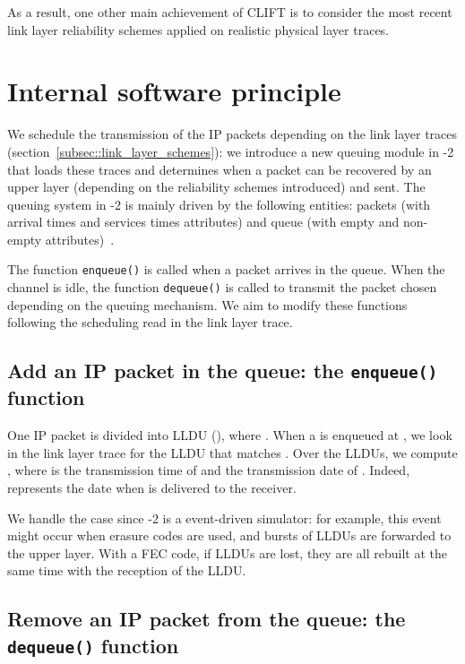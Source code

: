 \documentclass[conference,letterpaper]{IEEEtran}
\begin{document}
As a result, one other main achievement of CLIFT is to consider the most recent link layer reliability schemes applied on realistic physical layer traces.









\section{Internal software principle}
\label{sec::ns2}

We schedule the transmission of the IP packets depending on the link layer traces (section~\ref{subsec::link_layer_schemes}): we introduce a new queuing module in -2 that loads these traces and determines when a packet can be recovered by an upper layer (depending on the reliability schemes introduced) and sent. The queuing system in -2 is mainly driven by the following entities: packets (with arrival times and services times attributes) and queue (with empty and non-empty attributes)~\cite{ns2_manual}.

The function \texttt{enqueue()} is called when a packet arrives in the queue. When the channel is idle, the function \texttt{dequeue()} is called to transmit the packet chosen depending on the queuing mechanism. We aim to modify these functions following the scheduling read in the link layer trace.

\subsection{Add an IP packet in the queue: the \texttt{enqueue()} function}
\label{subsec::n2_enque}

One IP packet is divided into  LLDU (), where . When a  is enqueued at , we look in the link layer trace for the LLDU that matches . Over the  LLDUs, we compute , where  is the transmission time of  and  the transmission date of . Indeed,  represents the date when  is delivered to the receiver. 

We handle the case  since -2 is a event-driven simulator: for example, this event might occur when erasure codes are used, and bursts of LLDUs are forwarded to the upper layer. With a FEC code, if LLDUs are lost, they are all rebuilt at the same time with the reception of the  LLDU. 

\subsection{Remove an IP packet from the queue: the \texttt{dequeue()} function}
\label{subsec::n2_deque}
\end{document}
